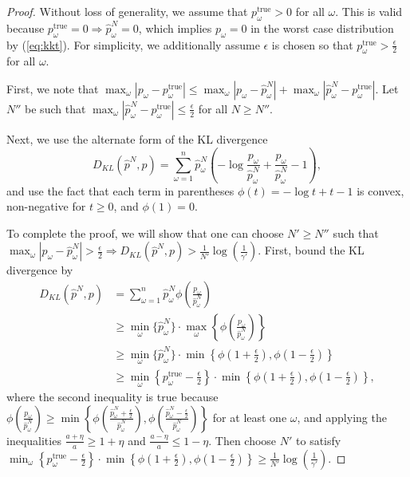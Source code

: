 \documentclass[11pt]{article}
\newcommand{\ptrue}{p^{\text{true}}}
\begin{document}
\begin{proof}
	Without loss of generality, we assume that $\ptrue_\omega > 0$ for all $\omega$.
	This is valid because $\ptrue_\omega = 0 \Rightarrow \hat{p}^N_\omega = 0$, which implies $p_\omega = 0$ in the worst case distribution by (\ref{eq:kkt}).
	For simplicity, we additionally assume $\epsilon$ is chosen so that $\ptrue_\omega > \frac{\epsilon}{2}$ for all $\omega$.
	
	First, we note that $\max_\omega |p_\omega - \ptrue_\omega| \leq \max_\omega |p_\omega - \hat{p}^N_\omega| + \max_\omega |\hat{p}^N_\omega - \ptrue_\omega|$.
	Let $N''$ be such that $\max_\omega |\hat{p}^N_\omega - \ptrue_\omega| \leq \frac{\epsilon}{2}$ for all $N \geq N''$.
	
	Next, we use the alternate form of the KL divergence
	\[
		D_{KL}(\hat{p}^N,p) = \sum_{\omega=1}^n \hat{p}^N_\omega \left( - \log \frac{p_\omega}{\hat{p}^N_\omega} + \frac{p_\omega}{\hat{p}^N_\omega} - 1 \right),
	\]
	and use the fact that each term in parentheses $\phi(t) = -\log t + t - 1$ is convex, non-negative for $t \geq 0$, and $\phi(1) = 0$.
	
	To complete the proof, we will show that one can choose $N' \geq N''$ such that $\max_\omega |p_\omega - \hat{p}^N_\omega| > \frac{\epsilon}{2} \Rightarrow D_{KL}(\hat{p}^N,p) > \frac{1}{N'} \log\left(\frac{1}{\gamma'}\right)$.
	First, bound the KL divergence by
	\begin{align*}
		D_{KL}(\hat{p}^N,p) & = \sum_{\omega=1}^n \hat{p}^N_\omega \phi\left( \frac{p_\omega}{\hat{p}^N_\omega} \right) \\
		& \geq \min_\omega \{\hat{p}^N_\omega\} \cdot \max_\omega \left\{ \phi \left( \frac{p_\omega}{\hat{p}^N_\omega} \right) \right\} \\
		& \geq \min_\omega \{\hat{p}^N_\omega\} \cdot \min\left\{ \phi\left(1+\frac{\epsilon}{2}\right), \phi\left(1-\frac{\epsilon}{2}\right) \right\} \\
		& \geq \min_\omega \left\{ \ptrue_\omega - \frac{\epsilon}{2} \right\} \cdot \min\left\{ \phi\left(1+\frac{\epsilon}{2}\right), \phi\left(1-\frac{\epsilon}{2}\right) \right\},
	\end{align*}
	where the second inequality is true because $\phi \left( \frac{p_\omega}{\hat{p}^N_\omega} \right) \geq \min\left\{ \phi\left( \frac{\hat{p}^N_\omega+\tfrac{\epsilon}{2}}{\hat{p}^N_\omega} \right), \phi\left( \frac{\hat{p}^N_\omega-\tfrac{\epsilon}{2}}{\hat{p}^N_\omega} \right) \right\}$ for at least one $\omega$, and applying the inequalities $\frac{a+\eta}{a} \geq 1 + \eta$ and $\frac{a-\eta}{a} \leq 1-\eta$.
	Then choose $N'$ to satisfy $\min_\omega \left\{ \ptrue_\omega - \frac{\epsilon}{2} \right\} \cdot \min\left\{ \phi\left(1+\frac{\epsilon}{2}\right), \phi\left(1-\frac{\epsilon}{2}\right) \right\} \geq \frac{1}{N'} \log\left(\frac{1}{\gamma'}\right)$.
\end{proof}
\end{document}
